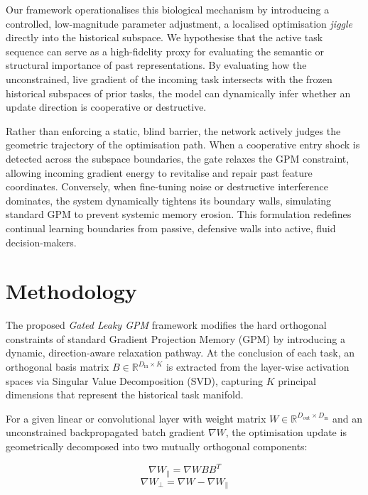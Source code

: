 \documentclass[10pt,a4paper]{article}
\begin{document}
		Our framework operationalises this biological mechanism by introducing a controlled, low-magnitude parameter adjustment, a localised optimisation \textit{jiggle} directly into the historical subspace. We hypothesise that the active task sequence can serve as a high-fidelity proxy for evaluating the semantic or structural importance of past representations. By evaluating how the unconstrained, live gradient of the incoming task intersects with the frozen historical subspaces of prior tasks, the model can dynamically infer whether an update direction is cooperative or destructive. 
		
		Rather than enforcing a static, blind barrier, the network actively judges the geometric trajectory of the optimisation path. When a cooperative entry shock is detected across the subspace boundaries, the gate relaxes the GPM constraint, allowing incoming gradient energy to revitalise and repair past feature coordinates. Conversely, when fine-tuning noise or destructive interference dominates, the system dynamically tightens its boundary walls, simulating standard GPM to prevent systemic memory erosion. This formulation redefines continual learning boundaries from passive, defensive walls into active, fluid decision-makers.
	
		\section{Methodology}
		
		The proposed \textit{Gated Leaky GPM} framework modifies the hard orthogonal constraints of standard Gradient Projection Memory (GPM) by introducing a dynamic, direction-aware relaxation pathway. At the conclusion of each task, an orthogonal basis matrix $B \in \mathbb{R}^{D_{\text{in}} \times K}$ is extracted from the layer-wise activation spaces via Singular Value Decomposition (SVD), capturing $K$ principal dimensions that represent the historical task manifold. 
		
		For a given linear or convolutional layer with weight matrix $W \in \mathbb{R}^{D_{\text{out}} \times D_{\text{in}}}$ and an unconstrained backpropagated batch gradient $\nabla W$, the optimisation update is geometrically decomposed into two mutually orthogonal components:
		
		\begin{equation}
			\nabla W_{\parallel} = \nabla W B B^T
		\end{equation}
		\begin{equation}
			\nabla W_{\perp} = \nabla W - \nabla W_{\parallel}
		\end{equation}
		
\end{document}
